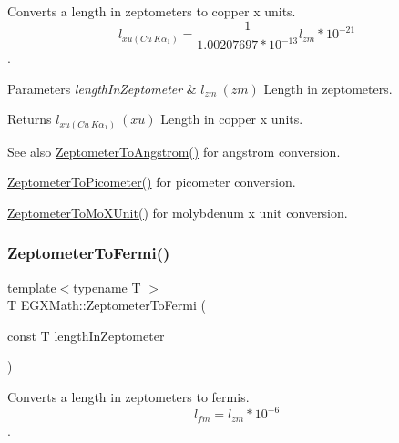 Converts a length in zeptometers to copper x units. \[ l_{xu(Cu\ K\alpha_1)}= \frac{1}{1.00207697*10^{-13}} l_{zm} * 10^{-21}\]. 


\begin{DoxyParams}{Parameters}
{\em length\+In\+Zeptometer} & $ l_{zm}\ (zm)$ Length in zeptometers. \\
\hline
\end{DoxyParams}
\begin{DoxyReturn}{Returns}
$ l_{xu(Cu\ K\alpha_1)}\ (xu)$ Length in copper x units. 
\end{DoxyReturn}
\begin{DoxySeeAlso}{See also}
\mbox{\hyperlink{group___e_g_x_math-_conversions-_length_conversions-_s_i-_zeptometer-_non-_s_i_gaa7023afd2a269dddf741cb4299803ef2}{Zeptometer\+To\+Angstrom()}} for angstrom conversion. 

\mbox{\hyperlink{group___e_g_x_math-_conversions-_length_conversions-_s_i-_zeptometer-_s_i_gae7409493227692a85b7fa5016a007de3}{Zeptometer\+To\+Picometer()}} for picometer conversion. 

\mbox{\hyperlink{group___e_g_x_math-_conversions-_length_conversions-_s_i-_zeptometer-_non-_s_i_gaa621a874847d7e6aae8d04395c68a313}{Zeptometer\+To\+Mo\+X\+Unit()}} for molybdenum x unit conversion. 
\end{DoxySeeAlso}
\mbox{\label{group___e_g_x_math-_conversions-_length_conversions-_s_i-_zeptometer-_non-_s_i_ga15c5cde158a9916cc01d998c7abc38c4}} 
\subsubsection{\texorpdfstring{Zeptometer\+To\+Fermi()}{ZeptometerToFermi()}}
{\footnotesize\ttfamily template$<$typename T $>$ \\
T E\+G\+X\+Math\+::\+Zeptometer\+To\+Fermi (\begin{DoxyParamCaption}\item[{const T}]{length\+In\+Zeptometer }\end{DoxyParamCaption})}



Converts a length in zeptometers to fermis. \[ l_{fm}=l_{zm} * 10^{-6} \]. 


